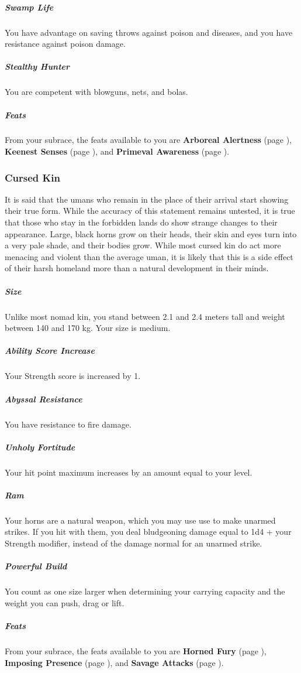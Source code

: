     \subparagraph{Swamp Life} You have advantage on saving throws against poison and diseases, and you have resistance against poison damage.

    \subparagraph{Stealthy Hunter} You are competent with blowguns, nets, and bolas.

    \subparagraph{Feats} From your subrace, the feats available to you are
    \textbf{Arboreal Alertness} (page \pageref{feat::arborealalertness}),
    \textbf{Keenest Senses} (page \pageref{feat::keenestsenses}), and
    \textbf{Primeval Awareness} (page \pageref{feat::primevalawareness}).

\subsubsection{Cursed Kin}
    It is said that the umans who remain in the place of their arrival start showing their true form.
    While the accuracy of this statement remains untested, it is true that those who stay in the forbidden lands do show strange changes to their appearance.
    Large, black horns grow on their heads, their skin and eyes turn into a very pale shade, and their bodies grow.
    While most cursed kin do act more menacing and violent than the average uman, it is likely that this is a side effect of their harsh homeland more than a natural development in their minds.

    \subparagraph{Size} Unlike most nomad kin, you stand between 2.1 and 2.4 meters tall and weight between 140 and 170 kg.
    Your size is medium.

    \subparagraph{Ability Score Increase} Your Strength score is increased by 1.


    \subparagraph{Abyssal Resistance} You have resistance to fire damage.

    \subparagraph{Unholy Fortitude} Your hit point maximum increases by an amount equal to your level.

    \subparagraph{Ram} Your horns are a natural weapon, which you may use use to make unarmed strikes.
    If you hit with them, you deal bludgeoning damage equal to 1d4 + your Strength modifier, instead of the damage normal for an unarmed strike.

    \subparagraph{Powerful Build} You count as one size larger when determining your carrying capacity and the weight you can push, drag or lift.

    \subparagraph{Feats} From your subrace, the feats available to you are
    \textbf{Horned Fury} (page \pageref{feat::hornedfury}),
    \textbf{Imposing Presence} (page \pageref{feat::imposingpresence}), and
    \textbf{Savage Attacks} (page \pageref{feat::savageattacks}).


\newpage
